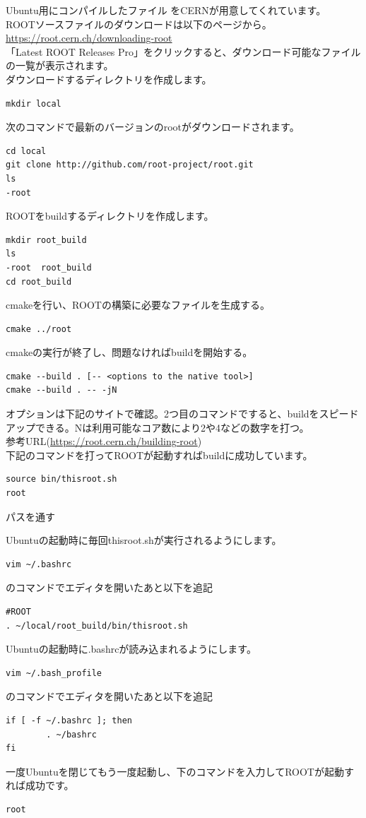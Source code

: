 \documentclass[uplatex,10pt,a4j]{jsarticle}
\begin{document}
Ubuntu用にコンパイルしたファイル をCERNが用意してくれています。\\
ROOTソースファイルのダウンロードは以下のページから。\\
\url{https://root.cern.ch/downloading-root}
\\
「Latest ROOT Releases Pro」をクリックすると、ダウンロード可能なファイルの一覧が表示されます。\\
ダウンロードするディレクトリを作成します。
\begin{lstlisting}
mkdir local
\end{lstlisting}
次のコマンドで最新のバージョンのrootがダウンロードされます。
\begin{lstlisting}
cd local
git clone http://github.com/root-project/root.git
ls
-root
\end{lstlisting}
ROOTをbuildするディレクトリを作成します。
\begin{lstlisting}
mkdir root_build
ls
-root  root_build
cd root_build
\end{lstlisting}
cmakeを行い、ROOTの構築に必要なファイルを生成する。
\begin{lstlisting}
cmake ../root
\end{lstlisting}
cmakeの実行が終了し、問題なければbuildを開始する。
\begin{lstlisting}
cmake --build . [-- <options to the native tool>]
cmake --build . -- -jN
\end{lstlisting}
オプションは下記のサイトで確認。2つ目のコマンドですると、buildをスピードアップできる。Nは利用可能なコア数により2や4などの数字を打つ。\\
参考URL(\url{https://root.cern.ch/building-root})\\
下記のコマンドを打ってROOTが起動すればbuildに成功しています。
\begin{lstlisting}
source bin/thisroot.sh
root
\end{lstlisting}
\vspace{0.3cm}
パスを通す
\vspace{0.3cm}

Ubuntuの起動時に毎回thisroot.shが実行されるようにします。
\begin{lstlisting}
vim ~/.bashrc
\end{lstlisting}
のコマンドでエディタを開いたあと以下を追記
\begin{lstlisting}
#ROOT
. ~/local/root_build/bin/thisroot.sh
\end{lstlisting}
Ubuntuの起動時に.bashrcが読み込まれるようにします。
\begin{lstlisting}
vim ~/.bash_profile
\end{lstlisting}
のコマンドでエディタを開いたあと以下を追記
\begin{lstlisting}
if [ -f ~/.bashrc ]; then
        . ~/bashrc
fi        
\end{lstlisting}
一度Ubuntuを閉じてもう一度起動し、下のコマンドを入力してROOTが起動すれば成功です。
\begin{lstlisting}
root
\end{lstlisting}
\end{document}
